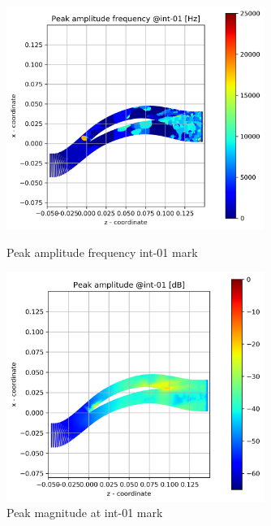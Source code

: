 \begin{figure}[ht]
  \centering
  \includegraphics[width=0.75\textwidth]{Figures/int-01-peak-freq.png}
  \caption{Peak amplitude frequency int-01 mark} \label{int-01-peak-freq}
  
  \vspace*{\floatsep}%

  \includegraphics[width=0.75\textwidth]{Figures/int-01-peak-mag.png}
  \caption{Peak magnitude at int-01 mark} \label{int-01-peak-mag}
\end{figure}

